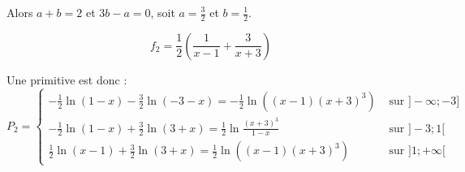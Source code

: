 \documentclass[a4paper,10pt]{report}
\begin{document}
Alors $a+b=2$ et $3b-a = 0$, soit $a=\frac{3}{2}$ et $b = \frac{1}{2}$.

\begin{displaymath}
	f_2 = \frac{1}{2} \left( \frac{1}{x-1} + \frac{3}{x+3} \right)
\end{displaymath}

Une primitive est donc :
\begin{displaymath}
	P_2 = 
	\begin{cases}
		-\frac{1}{2}\ln(1-x) -\frac{3}{2}\ln(-3-x) = -\frac{1}{2} \ln((x-1)(x+3)^3)      & \text{ sur } ]-\infty ; -3]\\
		-\frac{1}{2}\ln(1-x) +\frac{3}{2}\ln(3+x)  = \frac{1}{2} \ln \frac{(x+3)^3}{1-x} & \text{ sur } ]-3 ; 1[\\
		\frac{1}{2}\ln(x-1) +\frac{3}{2}\ln(3+x)   = \frac{1}{2} \ln((x-1)(x+3)^3)       & \text{ sur } ]1 ; +\infty[
	\end{cases}
\end{displaymath}
\end{document}
